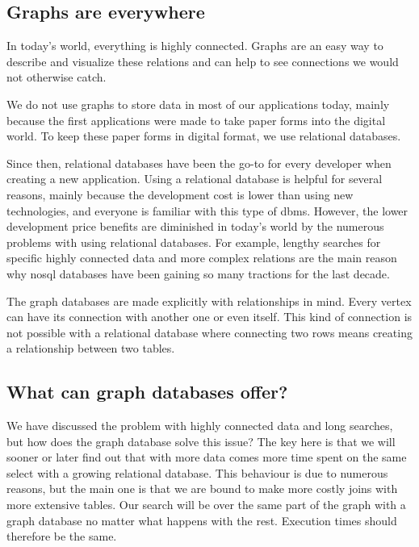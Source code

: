\begin{introduction}

    \section{Graphs are everywhere}

    In today's world, everything is highly connected.
    Graphs are an easy way to describe and visualize these relations and can help to see connections we would not otherwise catch.

    We do not use graphs to store data in most of our applications today, mainly because the first applications were made to take paper forms into the digital world.
    To keep these paper forms in digital format, we use relational databases.

    Since then, relational databases have been the go-to for every developer when creating a new application.
    Using a relational database is helpful for several reasons, mainly because the development cost is lower than using new technologies, and everyone is familiar with this type of \acrshort{dbms}.
    However, the lower development price benefits are diminished in today's world by the numerous problems with using relational databases.
    For example, lengthy searches for specific highly connected data and more complex relations are the main reason why \Gls{nosql} databases have been gaining so many tractions for the last decade.

    The graph databases are made explicitly with relationships in mind.
    Every vertex can have its connection with another one or even itself.
    This kind of connection is not possible with a relational database where connecting two rows means creating a relationship between two tables.

    \subsection{What can graph databases offer?}

    We have discussed the problem with highly connected data and long searches, but how does the graph database solve this issue?
    The key here is that we will sooner or later find out that with more data comes more time spent on the same select with a growing relational database.
    This behaviour is due to numerous reasons, but the main one is that we are bound to make more costly joins with more extensive tables.
    Our search will be over the same part of the graph with a graph database no matter what happens with the rest. Execution times should therefore be the same.


\end{introduction}
